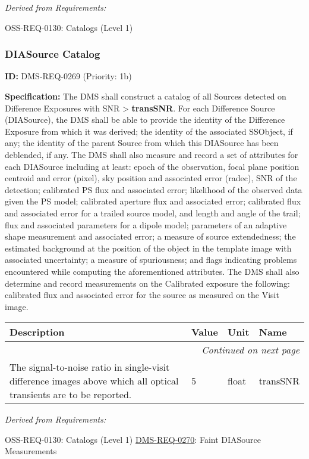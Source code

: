 \documentclass[SE,toc,lsstdraft]{lsstdoc}
\makeatletter
\newcommand{\paramname}[1]{\hspace{0pt}#1}
\newcommand{\unitname}[1]{\hspace{0pt}#1}
\newenvironment{parameters}[0]{%
\setlength\LTleft{0pt}
\setlength\LTright{\fill}
\begin{small}
\begin{longtable}[]{|p{0.49\textwidth}|l|p{0.6in}|p{1.70in}@{}|}

\hline \textbf{Description} & \textbf{Value} & \textbf{Unit} & \textbf{Name} \\ \hline
\endhead

\hline \multicolumn{4}{r}{\emph{Continued on next page}} \\
\endfoot

\hline\hline
\endlastfoot
}{%
\hline
\end{longtable}
\end{small}
}
\makeatother
\begin{document}
\emph{Derived from Requirements:}

OSS-REQ-0130:
Catalogs (Level 1) \newline

\subsubsection{DIASource Catalog}

\label{DMS-REQ-0269}
\textbf{ID:} DMS-REQ-0269 (Priority: 1b)

\textbf{Specification:} The DMS shall construct a catalog of all Sources detected on Difference Exposures with SNR > \textbf{transSNR}. For each Difference Source (DIASource), the DMS shall be able to provide the identity of the Difference Exposure from which it was derived; the identity of the associated SSObject, if any; the identity of the parent Source from which this DIASource has been deblended, if any. The DMS shall also measure and record a set of attributes for each DIASource including at least: epoch of the observation, focal plane position centroid and error (pixel), sky position and associated error (radec), SNR of the detection; calibrated PS flux and associated error; likelihood of the observed data given the PS model; calibrated aperture flux and associated error; calibrated flux and associated error for a trailed source model, and length and angle of the trail; flux and associated parameters for a dipole model; parameters of an adaptive shape measurement and associated error; a measure of source extendedness; the estimated background at the position of the object in the template image with associated uncertainty; a measure of spuriousness; and flags indicating problems encountered while computing the aforementioned attributes. The DMS shall also determine and record measurements on the Calibrated exposure the following: calibrated flux and associated error for the source as measured on the Visit image.

\begin{parameters}
The signal-to-noise ratio in single-visit difference images above which all optical transients are to be reported.
&
5
&
\unitname{%
float
}
&
\paramname{%
transSNR
} \\\hline
\end{parameters}

\emph{Derived from Requirements:}

OSS-REQ-0130:
Catalogs (Level 1) \newline
\hyperref[DMS-REQ-0270]{DMS-REQ-0270}:
Faint DIASource Measurements \newline
\end{document}
